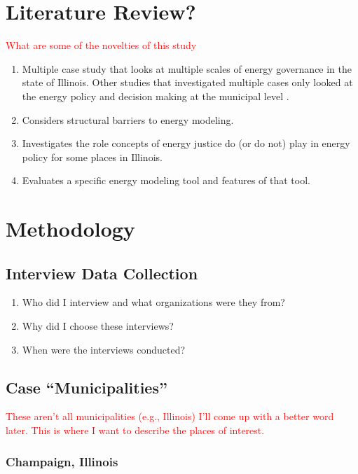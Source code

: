 \section{Literature Review?}

\textcolor{red}{What are some of the novelties of this study}
\begin{enumerate}
    \item Multiple case study that looks at multiple scales of energy governance in the state of Illinois.
    Other studies that investigated multiple cases only looked at the energy policy and decision making at
    the municipal level \cite{johannsen_designing_2021, ben_amer_too_2020}.
    \item Considers structural barriers to energy modeling.
    \item Investigates the role concepts of energy justice do (or do not) play in energy policy for some 
    places in Illinois.
    \item Evaluates a specific energy modeling tool and features of that tool.
\end{enumerate}

\section{Methodology}

\subsection{Interview Data Collection}

\begin{enumerate}
    \item Who did I interview and what organizations were they from?
    \item Why did I choose these interviews?
    \item When were the interviews conducted?
\end{enumerate}

\subsection{Case ``Municipalities''}

\textcolor{red}{These aren't all municipalities (e.g., Illinois) I'll come up with 
a better word later. This is where I want to describe the places of interest.}

\subsubsection{Champaign, Illinois}
